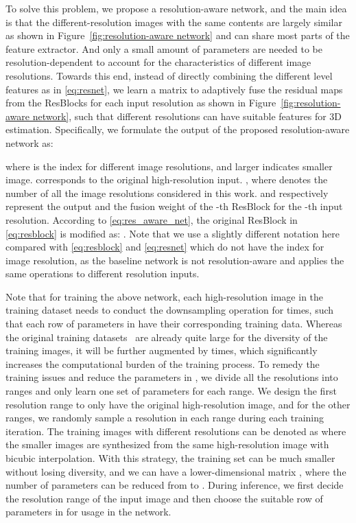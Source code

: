 \documentclass[runningheads]{llncs}
\begin{document}
To solve this problem, we propose a resolution-aware network, and the main idea is that the different-resolution images with the same contents are largely similar as shown in Figure~\ref{fig:resolution-aware network} and can share most parts of the feature extractor. And only a small amount of parameters are needed to be resolution-dependent to account for the characteristics of different image resolutions. 
Towards this end, instead of directly combining the different level features as in \eqref{eq:resnet},  
we learn a matrix  to adaptively fuse the residual maps from the ResBlocks for each input resolution as shown in Figure~\ref{fig:resolution-aware network}, such that different resolutions can have suitable features for 3D estimation.
Specifically, we formulate the output of the proposed resolution-aware network as:

where  is the index for different image resolutions, and larger  indicates smaller image.  corresponds to the original high-resolution input. , where  denotes the number of all the image resolutions considered in this work. 
 and  respectively represent the output and the fusion weight of the -th ResBlock for the -th input resolution.
According to \eqref{eq:res_aware_net}, the original ResBlock in \eqref{eq:resblock} is modified as: .
Note that we use a slightly different notation here compared with \eqref{eq:resblock} and \eqref{eq:resnet} which do not have the index  for image resolution, as the baseline network is not resolution-aware and applies the same operations to different resolution inputs.


Note that for training the above network, each high-resolution image in the training dataset needs to conduct the downsampling operation for  times, such that each row of parameters in  have their corresponding training data.
Whereas the original training datasets~\cite{3dpw,human3.6,mpi-inf-3dhp,mpii,coco} are already quite large for the diversity of the training images, it will be further augmented by  times, which significantly increases the computational burden of the training process.
To remedy the training issues and reduce the parameters in , we divide all the  resolutions into  ranges and only learn one set of parameters for each range. 
We design the first resolution range to only have the original high-resolution image, and for the other ranges, we randomly sample a resolution in each range during each training iteration.
The training images with different resolutions can be denoted as  where the smaller images  are synthesized from the same high-resolution image  with bicubic interpolation. 
With this strategy, the training set can be much smaller without losing diversity, and we can have a lower-dimensional matrix , where the number of parameters can be reduced from  to . 
During inference, we first decide the resolution range of the input image and then choose the suitable row of parameters in  for usage in the network. 
\end{document}
